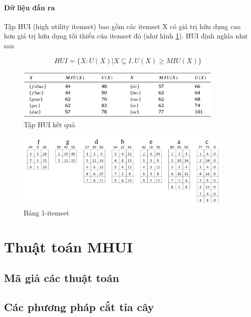 \paragraph{Dữ liệu đầu ra} Tập HUI (high utility itemset) bao gồm các itemset X có giá trị hữu dụng cao hơn giá trị hữu dụng tối thiểu của itemset đó (như hình \ref{fig:table6}). HUI định nghĩa như sau

$$HUI = \{ X : U(X) | X \subseteq I, U(X) \geq MIU(X) \} $$

\begin{figure}[h]
\centering
\includegraphics[width=0.9\textwidth]{image/table/table6.PNG}
\caption{\label{fig:table6} Tập HUI kết quả}
\end{figure}

\begin{figure}[h]
\centering
\includegraphics[width=0.95\textwidth]{image/algo/1itemset.PNG}
\caption{\label{fig:1itemset} Bảng 1-itemset}
\end{figure}

\section{Thuật toán MHUI}

\subsection{Mã giả các thuật toán}



\subsection{Các phương pháp cắt tỉa cây}

